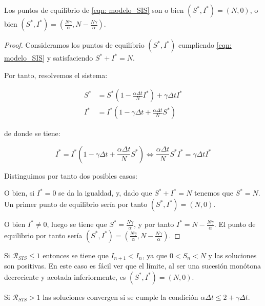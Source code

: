 \begin{lemma}
Los puntos de equilibrio de \eqref{eqn: modelo_SIS} son o bien $(S^*,I^*)=(N,0)$, o bien $(S^*,I^*)=(\frac{N\gamma}{\alpha}, N-\frac{N\gamma}{\alpha})$.
\end{lemma}

\begin{proof}
Consideramos los puntos de equilibrio $(S^*, I^*)$ cumpliendo \eqref{eqn: modelo_SIS} y satisfaciendo $S^*+I^*=N$.

Por tanto, resolvemos el sistema:

\begin{equation}
\begin{aligned}
S^* & = S^* \left(1-\frac{\alpha\Delta t}{N} I^* \right) + \gamma \Delta t I^* \\
I^* & = I^* \left( 1-\gamma \Delta t + \frac{\alpha\Delta t}{N} S^* \right)
\end{aligned}
\end{equation}

de donde se tiene:

$$I^* = I^* \left( 1-\gamma \Delta t + \frac{\alpha\Delta t}{N} S^* \right) \Leftrightarrow \frac{\alpha\Delta t}{N} S^*I^* = \gamma\Delta t I^*$$

Distinguimos por tanto dos posibles casos:

O bien, si $I^*=0$ se da la igualdad, y, dado que $S^*+I^*=N$ tenemos que $S^*=N$. Un primer punto de equilibrio sería por tanto $(S^*,I^*)=(N,0)$.

O bien $I^*\neq 0$, luego se tiene que $S^*=\frac{N\gamma}{\alpha}$, y por tanto $I^*=N-\frac{N\gamma}{\alpha}$. El punto de equilibrio por tanto sería $(S^*,I^*)=(\frac{N\gamma}{\alpha}, N-\frac{N\gamma}{\alpha})$.


\end{proof}


\begin{lemma}
Si $\mathcal{R}_{SIS}\leq 1$ entonces se tiene que $I_{n+1} < I_n$, ya que $0<S_n<N$ y las soluciones son positivas. En este caso es fácil ver que el límite, al ser una sucesión monótona decreciente y acotada inferiormente, es $(S^*,I^*)=(N,0)$.

Si $\mathcal{R}_{SIS}>1$ las soluciones convergen si se cumple la condición $\alpha \Delta t \leq 2+\gamma \Delta t$.
\end{lemma}

